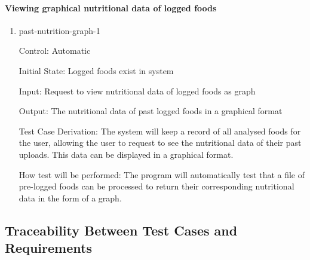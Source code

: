 \documentclass[12pt, titlepage]{article}
\begin{document}
	\paragraph{Viewing graphical nutritional data of logged foods}
	
	\begin{enumerate}
		
		\item{past-nutrition-graph-1\\}
		
		Control: Automatic
		
		Initial State: Logged foods exist in system
		
		Input: Request to view nutritional data of logged foods as graph
		
		Output: The nutritional data of past logged foods in a graphical format
		
		Test Case Derivation: The system will keep a record of all analysed foods for the user, allowing the user to request to see the nutritional data of their past uploads. This data can be displayed in a graphical format.
		
		How test will be performed: The program will automatically test that a file of pre-logged foods can be processed to return their corresponding nutritional data in the form of a graph.
		
	\end{enumerate}
	
	\subsection{Traceability Between Test Cases and Requirements}
	
\end{document}
